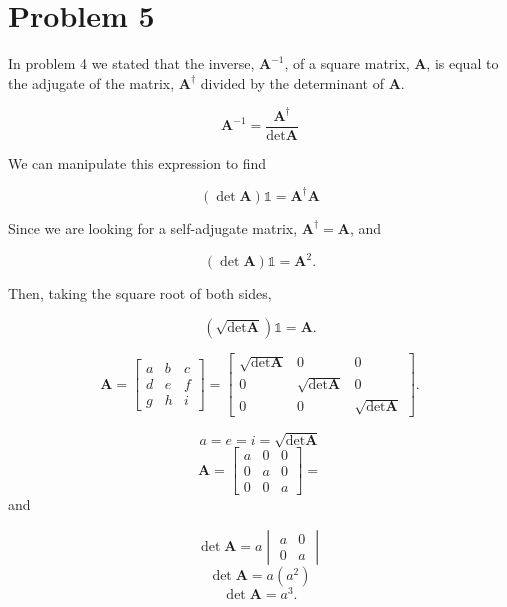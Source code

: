 \documentclass{article}
\begin{document}
\section*{Problem 5}

In problem 4 we stated that the inverse, $\textbf{A}^{-1}$, of a square matrix, $\textbf{A}$,  is equal to the adjugate of the matrix, $\textbf{A}^{\dagger}$ divided by the determinant of $\textbf{A}$.

$$ \textbf{A}^{-1} = \frac{\textbf{A}^{\dagger}}{\det{\textbf{A}}} $$

We can manipulate this expression to find

$$ (\det{\textbf{A}})\mathbb{1} = \textbf{A}^{\dagger}\textbf{A} $$

Since we are looking for a self-adjugate matrix, $\textbf{A}^{\dagger} = \textbf{A}$, and 

$$ (\det{\textbf{A}})\mathbb{1} = \textbf{A}^2 .$$

Then, taking the square root of both sides,

$$ \left(\sqrt{\det{\textbf{A}}}\right)\mathbb{1} = \textbf{A} .$$

$$ \textbf{A} = \begin{bmatrix} a & b & c \\
                                d & e & f \\
                                g & h & i \end{bmatrix} =
                \begin{bmatrix} \sqrt{\det{\textbf{A}}} & 0 & 0 \\
                                0 & \sqrt{\det{\textbf{A}}} & 0 \\
                                0 & 0 & \sqrt{\det{\textbf{A}}} \end{bmatrix}. $$
                
$$ a = e = i = \sqrt{\det{\textbf{A}}} $$
$$ \textbf{A} = \begin{bmatrix} a & 0 & 0 \\
                                0 & a & 0 \\
                                0 & 0 & a \end{bmatrix} = $$
and

$$ \det{\textbf{A}} = a \begin{vmatrix} a & 0 \\ 0 & a \end{vmatrix} $$
$$ \det{\textbf{A}} = a (a^2) $$
$$ \det{\textbf{A}} = a^3 .$$
\end{document}
